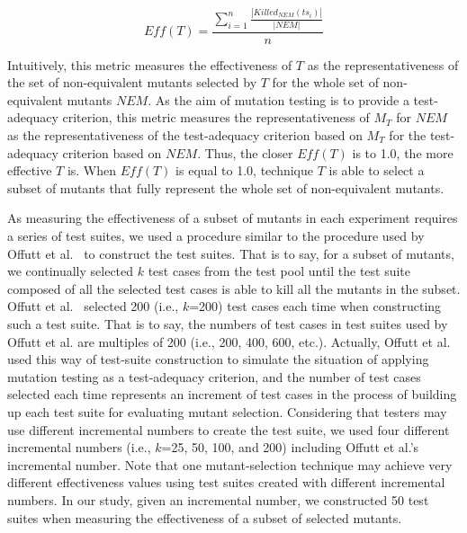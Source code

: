 \begin{equation}\label{form:Measurement}
    Eff(T)=\frac{\sum_{i=1}^n {\frac{|Killed_{NEM}(ts_i)|}{|NEM|}}}{n}
\end{equation}
\vspace{-2ex}

Intuitively, this metric measures the effectiveness of $T$ as the
representativeness of the set of non-equivalent mutants selected
by $T$ for the whole set of non-equivalent mutants $NEM$. As the
aim of mutation testing is to provide a test-adequacy criterion,
this metric measures the representativeness of $M_T$ for $NEM$ as
the representativeness of the test-adequacy criterion based on
$M_T$ for the test-adequacy criterion based on $NEM$. Thus, the
closer $Eff(T)$ is to 1.0, the more effective $T$ is. When
$Eff(T)$ is equal to 1.0, technique $T$ is able to select a subset
of mutants that fully represent the whole set of non-equivalent
mutants.

As measuring the effectiveness of a subset of mutants in each
experiment requires a series of test suites, we used a procedure
similar to the procedure used by Offutt et al.~\cite{Offutt:96} to
construct the test suites. That is to say, for a subset of
mutants, we continually selected $k$ test cases from the test pool
until the test suite composed of all the selected test cases is
able to kill all the mutants in the subset. Offutt et
al.~\cite{Offutt:96} selected 200 (i.e., $k$=200) test cases each
time when constructing such a test suite. That is to say, the
numbers of test cases in test suites used by Offutt et al. are
multiples of 200 (i.e., 200, 400, 600, etc.). Actually, Offutt et
al. used this way of test-suite construction to simulate the
situation of applying mutation testing as a test-adequacy
criterion, and the number of test cases selected each time
represents an increment of test cases in the process of building
up each test suite for evaluating mutant selection. Considering
that testers may use different incremental numbers to create the
test suite, we used four different incremental numbers (i.e.,
$k$=25, 50, 100, and 200) including Offutt et al.'s incremental
number. Note that one mutant-selection technique may achieve very
different effectiveness values using test suites created with
different incremental numbers. In our study, given an incremental
number, we constructed 50 test suites when measuring the
effectiveness of a subset of selected mutants.

